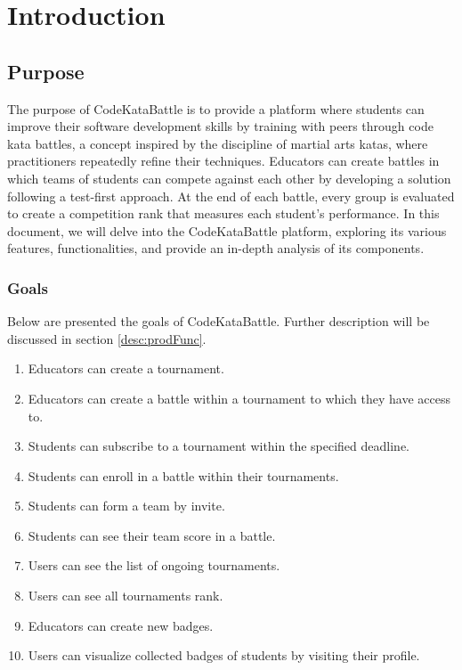 \chapter{Introduction}

\section{Purpose}
The purpose of CodeKataBattle is to provide a platform where students can improve their software development skills by training with peers through code kata battles, a concept inspired by the discipline of martial arts katas, where practitioners repeatedly refine their techniques.
Educators can create battles in which teams of students can compete against each other by developing a solution following a test-first approach.
At the end of each battle, every group is evaluated to create a competition rank that measures each student's performance.
In this document, we will delve into the CodeKataBattle platform, exploring its various features, functionalities, and provide an in-depth analysis of its components.


\subsection{Goals}
Below are presented the goals of CodeKataBattle. Further description will be discussed in section \ref{desc:prodFunc}.
\begin{enumerate}[label=\textbf{G.\arabic*}]
	\item {} {Educators can create a tournament.}
        \item {} {Educators can create a battle within a tournament to which they have access to.}
        \item {} {Students can subscribe to a tournament within the specified deadline.}
        \item {} {Students can enroll in a battle within their tournaments.}
        \item {} {Students can form a team by invite.}
        \item {} {Students can see their team score in a battle.}
        \item {} {Users can see the list of ongoing tournaments.}
        \item {} {Users can see all tournaments rank.}
        \item {} {Educators can create new badges.}
        \item {} {Users can visualize collected badges of students by visiting their profile.}
\end{enumerate}

